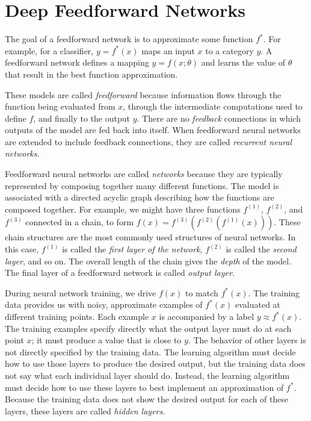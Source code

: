 \documentclass{report}
\begin{document}
\chapter{Deep Feedforward Networks}
The goal of a feedforward network is to approximate some function $f^*$. For example, for a classifier, $y=f^*(x)$ maps an input $x$ to a category $y$. A feedforward network defines a mapping $y=f(x;\theta)$ and learns the value of $\theta$ that result in the best function approximation.\newline

\noindent These models are called \textit{feedforward} because information flows through the function being evaluated from $x$, through the intermediate computations used to define $f$, and finally to the output $y$. There are no \textit{feedback} connections in which outputs of the model are fed back into itself. When feedforward neural networks are extended to include  feedback connections, they are called \textit{recurrent neural networks}.\newline

\noindent Feedforward neural networks are called \textit{networks} because they are typically represented by composing together many different functions. The model is associated with a directed acyclic graph describing how the functions are composed together. For example, we might have three functions $f^{(1)}$, $f^{(2)}$, and $f^{(3)}$ connected in a chain, to form $f(x) = f^{(3)}(f^{(2)}(f^{(1)}(x)))$. These chain structures are the most commonly used structures of neural networks. In this case, $f^{(1)}$ is called the \textit{first layer of the network}, $f^{(2)}$ is called the \textit{second layer}, and so on. The overall length of the chain gives the \textit{depth} of the model. The final layer of a feedforward network is called \textit{output layer}.\newline

\noindent During neural network training, we drive $f(x)$ to match $f^*(x)$. The training data provides us with noisy, approximate examples of $f^*(x)$ evaluated at different training points. Each example $x$ is accompanied by a label $y \approx f^*(x)$. The training examples specify directly what the output layer must do at each point $x$; it must produce a value that is close to $y$. The behavior of other layers is not directly specified by the training data. The learning algorithm must decide how to use those layers to produce the desired output, but the training data does not say what each individual layer should do. Instead, the learning algorithm must decide how to use these layers to best implement an approximation of $f^*$. Because the training data does not show the desired output for each of these layers, these layers are called \textit{hidden layers}.\newline
\end{document}
